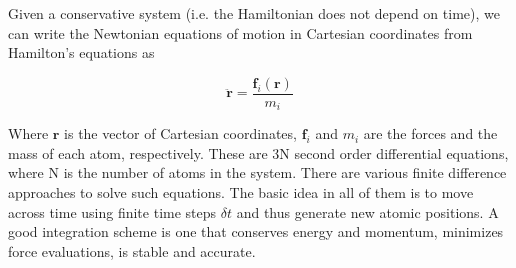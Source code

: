 \documentclass[aip,jcp,preprint,superscriptaddress,floatfix]{revtex4-1}
\begin{document}
Given a conservative system (i.e. the Hamiltonian does not depend on time), 
we can write the Newtonian equations of motion in Cartesian coordinates
from Hamilton's
equations as

\begin{equation}
	\ddot{\mathbf{r}} = \frac{\mathbf{f}_i\left( \mathbf{r} \right) }{\textit{m}_i}
\end{equation}

Where $\mathbf{r}$ is the vector of Cartesian coordinates, $\mathbf{f}_i$ and
 $\textit{m}_i$ are the forces and the mass of each atom, respectively.
These are 3N second order differential equations, where N is the number 
of atoms in the system. There are various finite difference approaches to solve
such equations. The basic idea in all of them is to move 
across time using finite time steps $\delta t$ and thus generate new atomic
positions. A good integration scheme is one that conserves energy 
and momentum, minimizes force evaluations, is stable and accurate. 
\end{document}
